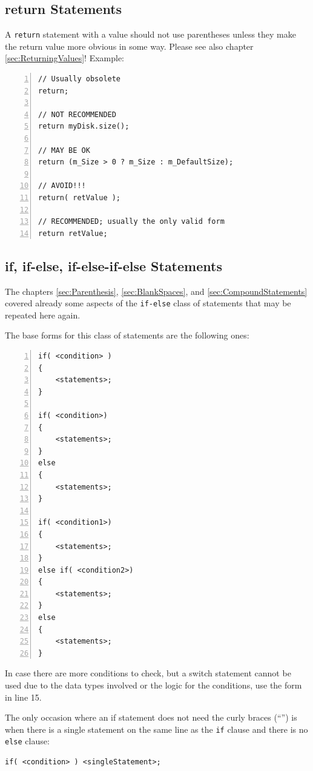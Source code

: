 \documentclass[12pt,a4paper,titlepage, parskip=half, headsepline, footsepline, cleardoubleplain]{scrbook}
\begin{document}
\subsection{return Statements}
A \lstinline|return| statement with a value should not use parentheses unless they make the return value more obvious in some way. Please see also chapter \vref{sec:ReturningValues}!
Example:
\begin{lstlisting}[numbers=left]
// Usually obsolete
return;

// NOT RECOMMENDED
return myDisk.size();

// MAY BE OK
return (m_Size > 0 ? m_Size : m_DefaultSize); 

// AVOID!!!
return( retValue );

// RECOMMENDED; usually the only valid form 
return retValue; 
\end{lstlisting}

\subsection{if, if-else, if-else-if-else Statements}\label{sec:IfStatements}
The chapters \ref{sec:Parenthesis}, \ref{sec:BlankSpaces}, and \ref{sec:CompoundStatements} covered already some aspects of the \lstinline|if-else| class of statements that may be repeated here again.

The base forms for this class of statements are the following ones:
\begin{lstlisting}[numbers=left]
if( <condition> )
{
    <statements>;
}

if( <condition>)
{
    <statements>;
}
else
{
    <statements>;
}

if( <condition1>)
{
    <statements>;
}
else if( <condition2>)
{
    <statements>;
}
else
{
    <statements>;
}
\end{lstlisting}

In case there are more conditions to check, but a switch statement cannot be used due to the data types involved or the logic for the conditions, use the form in line 15.

The only occasion where an if statement does not need the curly braces (“{}”) is when there is a single statement on the same line as the \lstinline|if| clause and there is no \lstinline|else| clause:

\begin{lstlisting}
if( <condition> ) <singleStatement>;
\end{lstlisting}
\end{document}
